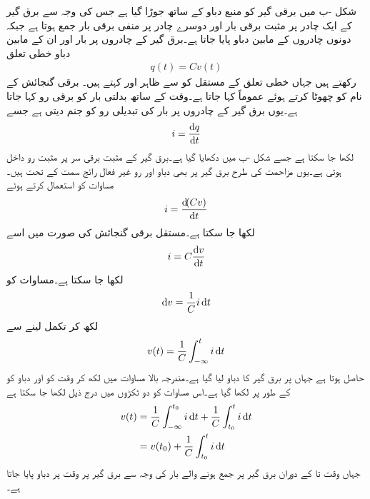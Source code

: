 شکل -ب میں برقی گیر کو  منبع دباو کے ساتھ جوڑا گیا ہے  جس کی وجہ سے برق گیر کے ایک چادر پر مثبت برقی بار  اور دوسرے چادر پر منفی برقی بار  جمع ہوتا ہے جبکہ دونوں چادروں کے مابین دباو  پایا جاتا ہے۔برق گیر کے چادروں پر بار اور ان کے مابین دباو خطی تعلق
\begin{align}\label{مساوات_امالہ_بار_دباو_تعلق}
q(t)=C v(t)
\end{align}
رکھتے ہیں جہاں خطی تعلق کے مستقل کو  سے ظاہر اور   کہتے ہیں۔ برقی گنجائش کے نام کو چھوٹا کرتے ہوئے عموماً  کہا جاتا ہے۔وقت کے ساتھ بدلتی بار کو برقی رو کہا جاتا ہے۔یوں برق گیر کے چادروں پر بار کی تبدیلی رو کو جنم دیتی ہے جسے
\begin{align}
i=\frac{\dif q}{\dif t}
\end{align}
لکھا جا سکتا ہے جسے شکل -ب میں دکھایا گیا ہے۔برق گیر کے مثبت برقی سر پر مثبت رو داخل ہوتی ہے۔یوں مزاحمت کی طرح  برق گیر پر بھی دباو اور رو غیر فعال رائج سمت کے تحت ہیں۔ مساوات  کو استعمال کرتے ہوئے 
\begin{align}
i=\frac{\dif (C v)}{\dif t}
\end{align}
لکھا جا سکتا ہے۔مستقل برقی گنجائش کی صورت میں اسے
\begin{align}\label{مساوات_امالہ_بار_دباو_تعلق_ب}
i=C\frac{\dif v}{\dif t}
\end{align}
لکھا جا سکتا ہے۔مساوات  کو
\begin{align*}
\dif v = \frac{1}{C} i \dif t
\end{align*}
لکھ کر تکمل لینے سے
\begin{align}\label{مساوات_امالہ_بار_دباو_تعلق_پ}
v(t)=\frac{1}{C} \int_{-\infty}^{t} i \dif t
\end{align}
حاصل ہوتا ہے جہاں  پر برق گیر کا دباو  لیا گیا ہے۔مندرجہ بالا مساوات میں  لکھ کر وقت کو  اور دباو کو  کے طور پر لکھا گیا ہے۔اس مساوات کو دو ٹکڑوں میں درج ذیل لکھا جا سکتا ہے
\begin{gather}
\begin{aligned}\label{مساوات_امالہ_ابتدائی_دباو_الف}
v(t)&=\frac{1}{C} \int_{-\infty}^{t_0} i \dif t+\frac{1}{C} \int_{t_0}^{t} i \dif t\\
&=v(t_0)+\frac{1}{C} \int_{t_0}^{t} i \dif t
\end{aligned}
\end{gather}
جہاں وقت  تا  کے دوران برق گیر پر جمع ہونے والے بار کی وجہ سے  برق گیر پر وقت  پر دباو  پایا جاتا ہے۔ 

